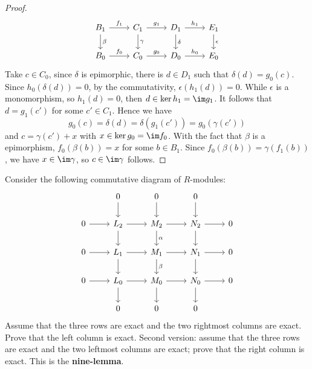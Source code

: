 \begin{proof}
\[\begin{tikzcd}
B_1\ar[r,"f_1"]\ar[d,"\beta"]&C_1\ar[r,"g_1"]\ar[d,"\gamma"]&D_1\ar[r,"h_1"]\ar[d,"\delta"]&E_1\ar[d,"\epsilon"]\\
B_0\ar[r,"f_0"]&C_0\ar[r,"g_0"]&D_0\ar[r,"h_0"]&E_0
\end{tikzcd}\]
Take $c\in C_0$, since $\delta$ is epimorphic, there is $d\in D_1$ such that $\delta(d)=g_0(c)$. Since $h_0(\delta(d))=0$, by the commutativity, $\epsilon(h_1(d))=0$. While $\epsilon$ is a monomorphism, so $h_1(d)=0$, then $d\in\ker h_1=\im g_1$. It follows that $d=g_1(c')$ for some $c'\in C_1$. Hence we have
\[g_0(c)=\delta(d)=\delta(g_1(c'))=g_0(\gamma(c'))\]
and $c=\gamma(c')+x$ with $x\in\ker g_0=\im f_0$. With the fact that $\beta$ is a epimorphism, $f_0(\beta(b))=x$ for some $b\in B_1$. Since $f_0(\beta(b))=\gamma(f_1(b))$, we have $x\in\im\gamma$, so $c\in\im\gamma$ follows.
\end{proof}
\begin{exercise}\label{nine lemma}
Consider the following commutative diagram of $R$-modules:
\[\begin{tikzcd}
&0\ar[d] &0\ar[d] &0\ar[d]\\
0\ar[r]&L_2\ar[d]\ar[r]&M_2\ar[r]\ar[d,"\alpha"]&N_2\ar[r]\ar[d]&0\\
0\ar[r]&L_1\ar[d]\ar[r]&M_1\ar[r]\ar[d,"\beta"]&N_1\ar[r]\ar[d]&0\\
0\ar[r]&L_0\ar[d]\ar[r]&M_0\ar[r]\ar[d]&N_0\ar[r]\ar[d]&0\\
&0&0&0
\end{tikzcd}\]
Assume that the three rows are exact and the two rightmost columns are exact. Prove that the left column is exact. Second version: assume that the three rows are exact and the two leftmost columns are exact; prove that the right column is exact. This is the \textbf{nine-lemma}.
\end{exercise}
